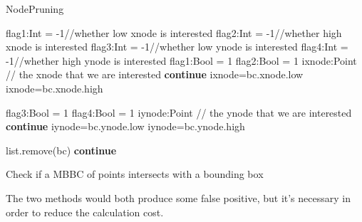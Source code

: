 \documentclass[sigplan]{acmart}
\begin{document}
\begin{algorithm}
\caption{NodePruning} \label{alg:nodeprune}
\begin{algorithmic}[1]
        \State flag1:Int = -1//whether low xnode is interested
        \State flag2:Int = -1//whether high xnode is interested
        \State flag3:Int = -1//whether low ynode is interested
        \State flag4:Int = -1//whether high ynode is interested
            \State flag1:Bool = 1 
        \EnfIf
            \State flag2:Bool = 1
        \EnfIf
        ixnode:Point // the xnode that we are interested
            \State \textbf{continue}
            \State ixnode=bc.xnode.low
            \State ixnode=bc.xnode.high
        \EnfIf
        

            \State flag3:Bool = 1
        \EnfIf
            \State flag4:Bool = 1
        \EnfIf
        iynode:Point // the ynode that we are interested
            \State \textbf{continue}
            \State iynode=bc.ynode.low
            \State iynode=bc.ynode.high
        \EnfIf

                \State list.remove(bc)
                \State \textbf{continue}
            \EndIf
        \EndIf
    \EndFor 
\EndFunction
\end{algorithmic}
\end{algorithm}


\begin{algorithm}
\caption{Check if a MBBC of points intersects with a bounding box} \label{alg:intersect}
\begin{algorithmic}[1]
\State
\EndFunction
\end{algorithmic}
\end{algorithm}

The two methods would both produce some false positive, but it's necessary in order to reduce the calculation cost.
\par
\end{document}
